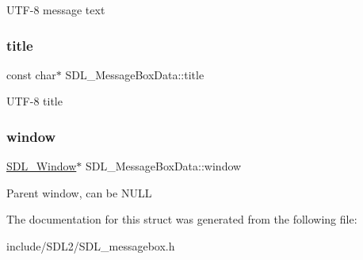 U\+T\+F-\/8 message text \mbox{\label{struct_s_d_l___message_box_data_a93ceeafeed20b553ad4c86c9be37f117}} 
\subsubsection{\texorpdfstring{title}{title}}
{\footnotesize\ttfamily const char$\ast$ S\+D\+L\+\_\+\+Message\+Box\+Data\+::title}

U\+T\+F-\/8 title \mbox{\label{struct_s_d_l___message_box_data_a5c333bc93705c66068e140bc28daedcb}} 
\subsubsection{\texorpdfstring{window}{window}}
{\footnotesize\ttfamily \hyperlink{_s_d_l__video_8h_a55a196c7d3b8497538632c79ae1e6392}{S\+D\+L\+\_\+\+Window}$\ast$ S\+D\+L\+\_\+\+Message\+Box\+Data\+::window}

Parent window, can be N\+U\+LL 

The documentation for this struct was generated from the following file\+:\begin{DoxyCompactItemize}
\item 
include/\+S\+D\+L2/S\+D\+L\+\_\+messagebox.\+h\end{DoxyCompactItemize}
